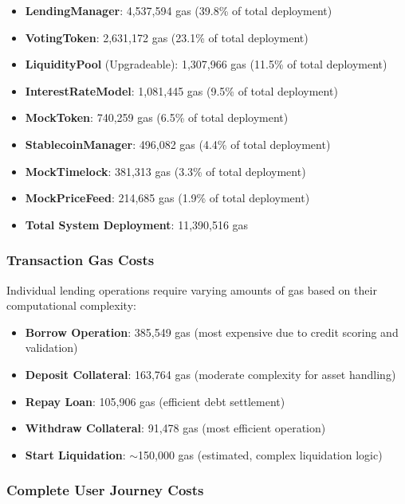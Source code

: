 \begin{itemize}
    \item \textbf{LendingManager}: 4,537,594 gas (39.8\% of total deployment)
    \item \textbf{VotingToken}: 2,631,172 gas (23.1\% of total deployment)
    \item \textbf{LiquidityPool} (Upgradeable): 1,307,966 gas (11.5\% of total deployment)
    \item \textbf{InterestRateModel}: 1,081,445 gas (9.5\% of total deployment)
    \item \textbf{MockToken}: 740,259 gas (6.5\% of total deployment)
    \item \textbf{StablecoinManager}: 496,082 gas (4.4\% of total deployment)
    \item \textbf{MockTimelock}: 381,313 gas (3.3\% of total deployment)
    \item \textbf{MockPriceFeed}: 214,685 gas (1.9\% of total deployment)
    \item \textbf{Total System Deployment}: 11,390,516 gas
\end{itemize}

\subsubsection{Transaction Gas Costs}

Individual lending operations require varying amounts of gas based on their computational complexity:

\begin{itemize}
    \item \textbf{Borrow Operation}: 385,549 gas (most expensive due to credit scoring and validation)
    \item \textbf{Deposit Collateral}: 163,764 gas (moderate complexity for asset handling)
    \item \textbf{Repay Loan}: 105,906 gas (efficient debt settlement)
    \item \textbf{Withdraw Collateral}: 91,478 gas (most efficient operation)
    \item \textbf{Start Liquidation}: $\sim$150,000 gas (estimated, complex liquidation logic)
\end{itemize}

\subsubsection{Complete User Journey Costs}

